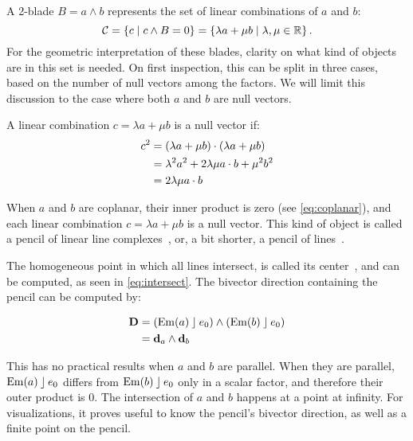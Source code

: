 %
A 2-blade $B = a \wedge b$ represents the set of linear combinations of $a$ and $b$:
\begin{equation*}
  \mathcal{C} = \left\{ c \mid c \wedge B = 0 \right\} = \left\{ \lambda a + \mu b \mid \lambda, \mu \in \mathbb{R} \right\} .
\end{equation*}
For the geometric interpretation of these blades, clarity on what kind of objects are in this set is needed.  On first inspection, this can be split in three cases, based on the number of null vectors among the factors.  We will limit this discussion to the case where both $a$ and $b$ are null vectors.

A linear combination $c = \lambda a + \mu b$ is a null vector if:
\begin{align}
  \label{eq:lincombnull}
  c^2 &= (\lambda a + \mu b) \mathbin{\cdot} (\lambda a + \mu b) \nonumber \\
  &= \lambda^2 a^2 + 2 \lambda \mu a \mathbin{\cdot} b + \mu^2 b^2 \nonumber \\
  &= 2 \lambda \mu a \mathbin{\cdot} b
\end{align}

When $a$ and $b$ are coplanar, their inner product is zero (see \autoref{eq:coplanar}), and each linear combination $c = \lambda a + \mu b$ is a null vector.  This kind of object is called a pencil of linear line complexes~\cite[Section 3.2.1]{Pottmann}, or, a bit shorter, a pencil of lines~\cite{Hongbo}.

The homogeneous point in which all lines intersect, is called its center~\cite{Hongbo}, and can be computed, as seen in \autoref{eq:intersect}.  The bivector direction containing the pencil can be computed by:

\begin{align*}
  \mathbf{D} &= \left(\operatorname{Em}(a) \mathbin{\rfloor} e_0 \right) \wedge \left(\operatorname{Em}(b) \mathbin{\rfloor} e_0\right) \\
  &= \mathbf{d}_a \wedge \mathbf{d}_b 
\end{align*}

This has no practical results when $a$ and $b$ are parallel.  When they are parallel, $\operatorname{Em}(a) \mathbin{\rfloor} e_0$ differs from $\operatorname{Em}(b) \mathbin{\rfloor} e_0$ only in a scalar factor, and therefore their outer product is $0$.  The intersection of $a$ and $b$ happens at a point at infinity.  For visualizations, it proves useful to know the pencil's bivector direction, as well as a finite point on the pencil.  

